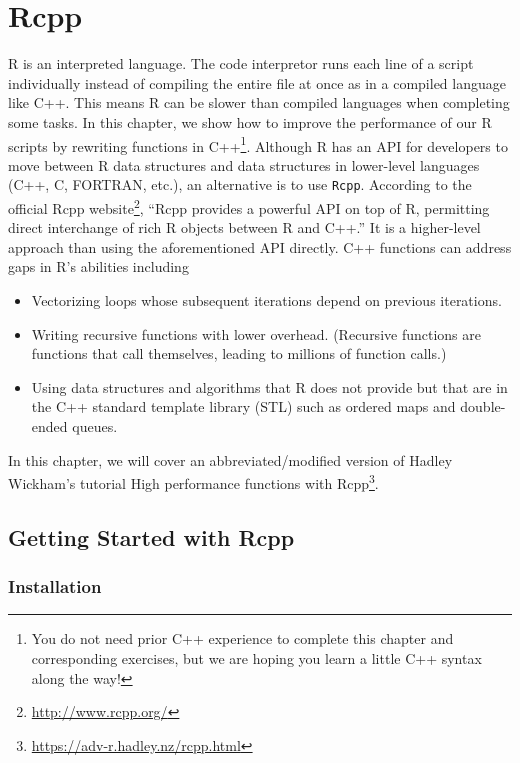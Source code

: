 \documentclass[
]{krantz}
\providecommand{\tightlist}{%
  \setlength{\itemsep}{0pt}\setlength{\parskip}{0pt}}
\renewcommand{\href}[2]{#2\footnote{\url{#1}}}
\begin{document}
\hypertarget{rcpp}{%
\chapter{Rcpp}\label{rcpp}}

R is an interpreted language. The code interpretor runs each line of a script individually instead of compiling the entire file at once as in a compiled language like C++. This means R can be slower than compiled languages when completing some tasks. In this chapter, we show how to improve the performance of our R scripts by rewriting functions in C++\footnote{You do not need prior C++ experience to complete this chapter and corresponding exercises, but we are hoping you learn a little C++ syntax along the way!}. Although R has an API for developers to move between R data structures and data structures in lower-level languages (C++, C, FORTRAN, etc.), an alternative is to use \texttt{Rcpp}. According to the \href{http://www.rcpp.org/}{official Rcpp website}, ``Rcpp provides a powerful API on top of R, permitting direct interchange of rich R objects between R and C++.'' It is a higher-level approach than using the aforementioned API directly. C++ functions can address gaps in R's abilities including

\begin{itemize}
\tightlist
\item
  Vectorizing loops whose subsequent iterations depend on previous iterations.
\item
  Writing recursive functions with lower overhead. (Recursive functions are functions that call themselves, leading to millions of function calls.)
\item
  Using data structures and algorithms that R does not provide but that are in the C++ standard template library (STL) such as ordered maps and double-ended queues.
\end{itemize}

In this chapter, we will cover an abbreviated/modified version of Hadley Wickham's tutorial \href{https://adv-r.hadley.nz/rcpp.html}{High performance functions with Rcpp}.

\hypertarget{getting-started-with-rcpp}{%
\section{Getting Started with Rcpp}\label{getting-started-with-rcpp}}

\hypertarget{installation}{%
\subsection{Installation}\label{installation}}
\end{document}
